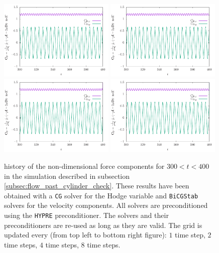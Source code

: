\documentclass[11pt, a4paper]{article}
\theoremstyle{remark}
\begin{document}
\begin{figure}
  \centering
  \includegraphics[width=0.49\textwidth]{./results/flow_past_cylinder_smoke/optimized_run_reused_solvers_cg_and_pchypre/grid_update_1/force_history.pdf} 
  \includegraphics[width=0.49\textwidth]{./results/flow_past_cylinder_smoke/optimized_run_reused_solvers_cg_and_pchypre/grid_update_2/force_history.pdf} \\
  \includegraphics[width=0.49\textwidth]{./results/flow_past_cylinder_smoke/optimized_run_reused_solvers_cg_and_pchypre/grid_update_4/force_history.pdf}
  \includegraphics[width=0.49\textwidth]{./results/flow_past_cylinder_smoke/optimized_run_reused_solvers_cg_and_pchypre/grid_update_8/force_history.pdf} \\
 \caption{\label{fig:forces_flow_past_cylinder_reused_solvers_cg_and_hypre} history of the non-dimensional force components for $300 < t < 400$ in the simulation described in subsection \ref{subsec:flow_past_cylinder_check}. These results have been obtained with a \texttt{CG} solver for the Hodge variable and \texttt{BiCGStab} solvers for the velocity components. All solvers are preconditioned using the \texttt{HYPRE} preconditioner. The solvers and their preconditioners are re-used as long as they are valid. The grid is updated every (from top left to bottom right figure): $1$ time step, $2$ time steps, $4$ time steps, $8$ time steps.} 
\end{figure}
\end{document}
